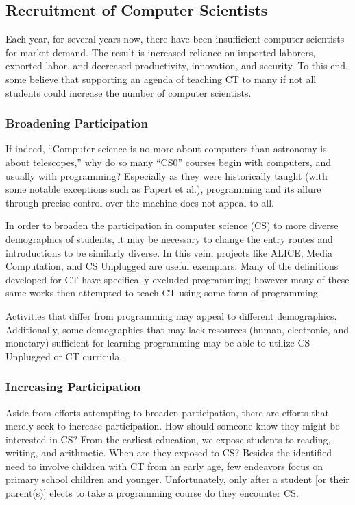 \documentclass{acm_proc_article-sp}
\begin{document}
\subsection{Recruitment of Computer Scientists}
\label{sec:recruitment}
Each year, for several years now, there have been insufficient computer scientists for market demand.
The result is increased reliance on imported laborers, exported labor, and decreased productivity, innovation, and security.
To this end, some believe that supporting an agenda of teaching CT to many if not all students could increase the number of computer scientists.

\subsubsection{Broadening Participation}
\label{sec:broadening_participation}
If indeed, ``Computer science is no more about computers than astronomy is about telescopes,''\cite{cs-astronomy} why do so many ``CS0'' courses begin with computers, and usually with programming? Especially as they were historically taught (with some notable exceptions such as Papert et al.)\cite{logo-readings}, programming and its allure through precise control over the machine does not appeal to all.

In order to broaden the participation in computer science (CS) to more diverse demographics of students, it may be necessary to change the entry routes and introductions to be similarly diverse. 
In this vein, projects like ALICE\cite{pausch1995alice}, Media Computation\cite{guzdial2003media}, and CS Unplugged\cite{csunplugged} are useful exemplars.
Many of the definitions developed for CT have specifically excluded programming; however many of these same works then attempted to teach CT using some form of programming.

Activities that differ from programming may appeal to different demographics.
Additionally, some demographics that may lack resources (human, electronic, and monetary) sufficient for learning programming may be able to utilize CS Unplugged or CT curricula.

\subsubsection{Increasing Participation}
\label{sec:increasing_participation}
Aside from efforts attempting to broaden participation, there are efforts that merely seek to increase participation.
How should someone know they might be interested in CS?
From the earliest education, we expose students to reading, writing, and arithmetic.
When are they exposed to CS?
Besides the identified need to involve children with CT from an early age, few endeavors focus on primary school children and younger.
Unfortunately, only after a student [or their parent(s)] elects to take a programming course do they encounter CS. 
\end{document}
